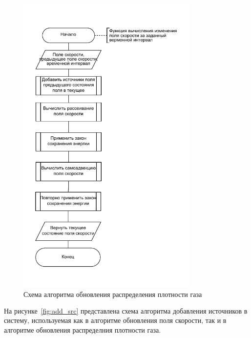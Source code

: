\begin{figure}[H]
	\centering
	\includegraphics[width=0.8\textwidth, page=1]{assets/img/velocity_step.pdf}   
	\caption{Схема алгоритма обновления распределения плотности газа}
	\label{fig:vel_step}
\end{figure}

На рисунке~\ref{fig:add_src} представлена схема алгоритма добавления источников в систему, используемая как в алгоритме обновления поля скорости, так и в алгоритме обновления распределния плотности газа.

